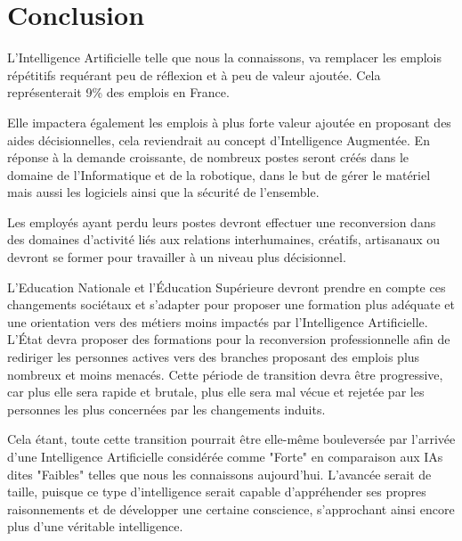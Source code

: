 \chapter*{Conclusion}
L'Intelligence Artificielle telle que nous la connaissons, va remplacer les emplois répétitifs requérant peu de réflexion et
à peu de valeur ajoutée. Cela représenterait 9\% des emplois en France. \newline

Elle impactera également les emplois à plus forte valeur ajoutée en proposant des aides décisionnelles,
cela reviendrait au concept d'Intelligence Augmentée. En réponse à la demande croissante, de nombreux postes seront créés dans le domaine
de l'Informatique et de la robotique, dans le but de gérer le matériel mais aussi les logiciels ainsi que la sécurité de l'ensemble. \newline

Les employés ayant perdu leurs postes devront effectuer une reconversion dans des domaines d'activité liés
aux relations interhumaines, créatifs, artisanaux ou devront se former pour travailler à un niveau plus décisionnel. \newline

L'Education Nationale et l'Éducation Supérieure devront prendre en compte
ces changements sociétaux et s'adapter pour proposer une formation plus adéquate et une orientation vers des métiers moins impactés par
l'Intelligence Artificielle. L'État devra proposer des formations pour la reconversion professionnelle afin de rediriger les personnes actives
vers des branches proposant des emplois plus nombreux et moins menacés.
Cette période de transition devra être progressive, car plus elle sera rapide et brutale, plus elle sera
mal vécue et rejetée par les personnes les plus concernées par les changements induits. \newline

Cela étant, toute cette transition pourrait être elle-même bouleversée par l'arrivée d'une Intelligence
Artificielle considérée comme "Forte" en comparaison aux IAs dites "Faibles" telles que nous les connaissons aujourd'hui. L'avancée
serait de taille, puisque ce type d'intelligence serait capable d'appréhender ses propres raisonnements et de développer une certaine
conscience, s'approchant ainsi encore plus d'une véritable intelligence.
